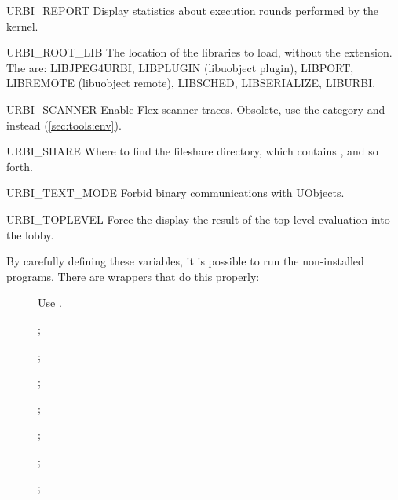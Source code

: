 \begin{envs}
\item[URBI\_REPORT] Display statistics about execution rounds performed by
  the kernel.

\item[URBI\_ROOT\_LIB\var{name}] The location of the libraries to load,
  without the extension.  The  are: LIBJPEG4URBI,
  LIBPLUGIN (libuobject plugin), LIBPORT, LIBREMOTE (libuobject remote),
  LIBSCHED, LIBSERIALIZE, LIBURBI.

\item[URBI\_SCANNER] Enable Flex scanner traces.  Obsolete, use the
   category and  instead
  (\autoref{sec:tools:env}).

\item[URBI\_SHARE] Where to find the file{share} directory, which contains
  ,  and so forth.

\item[URBI\_TEXT\_MODE] Forbid binary communications with UObjects.

\item[URBI\_TOPLEVEL] Force the display the result of the top-level
  evaluation into the lobby.
\end{envs}

By carefully defining these variables, it is possible to run the
non-installed programs.  There are wrappers that do this properly:
\begin{description}
\item[] Use .
\item[]
  ;
\item[]
  ;
\item[]
  ;
\item[]
  ;
\item[]
  ;
\item[]
  ;
\item[]
  ;
\end{description}


